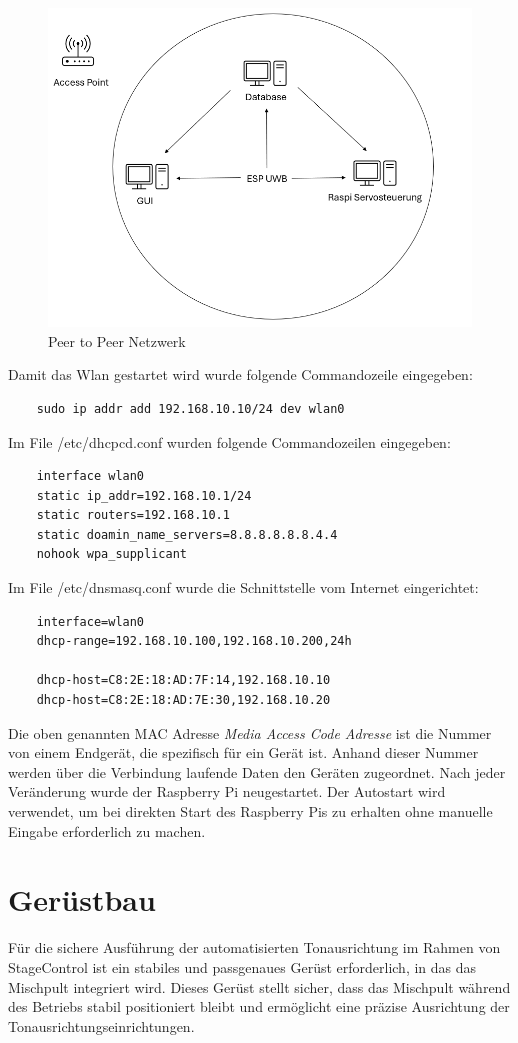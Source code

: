\begin{figure}[H]
	\centering
	\includegraphics[width=0.5\linewidth]{images/Peer to Peer Netzwerk.png}
	\caption[Peer to Peer Netzwerk]{Peer to Peer Netzwerk}
	\label{fig:Peer to Peer Netzwerk} 
\end{figure}

\newpage
Damit das Wlan gestartet wird wurde folgende Commandozeile eingegeben: 
\begin{lstlisting}
	sudo ip addr add 192.168.10.10/24 dev wlan0 
\end{lstlisting}

Im File /etc/dhcpcd.conf wurden folgende Commandozeilen eingegeben: 
\begin{lstlisting}
	interface wlan0
	static ip_addr=192.168.10.1/24
	static routers=192.168.10.1
	static doamin_name_servers=8.8.8.8.8.8.4.4
	nohook wpa_supplicant
\end{lstlisting}

Im File /etc/dnsmasq.conf wurde die Schnittstelle vom Internet eingerichtet:
\begin{lstlisting}
	interface=wlan0
	dhcp-range=192.168.10.100,192.168.10.200,24h
	
	dhcp-host=C8:2E:18:AD:7F:14,192.168.10.10
	dhcp-host=C8:2E:18:AD:7E:30,192.168.10.20
\end{lstlisting} 

Die oben genannten MAC Adresse \textit{Media Access Code Adresse} ist die Nummer von einem Endgerät, die spezifisch für ein Gerät ist. Anhand dieser Nummer werden über die Verbindung laufende Daten den Geräten zugeordnet. Nach jeder Veränderung wurde der Raspberry Pi neugestartet. Der Autostart wird verwendet, um bei direkten Start des Raspberry Pis zu erhalten ohne manuelle Eingabe erforderlich zu machen.

\newpage
\section{Gerüstbau}
Für die sichere Ausführung der automatisierten Tonausrichtung im Rahmen von StageControl ist ein stabiles und passgenaues Gerüst erforderlich, in das das Mischpult integriert wird. Dieses Gerüst stellt sicher, dass das Mischpult während des Betriebs stabil positioniert bleibt und ermöglicht eine präzise Ausrichtung der Tonausrichtungseinrichtungen.


